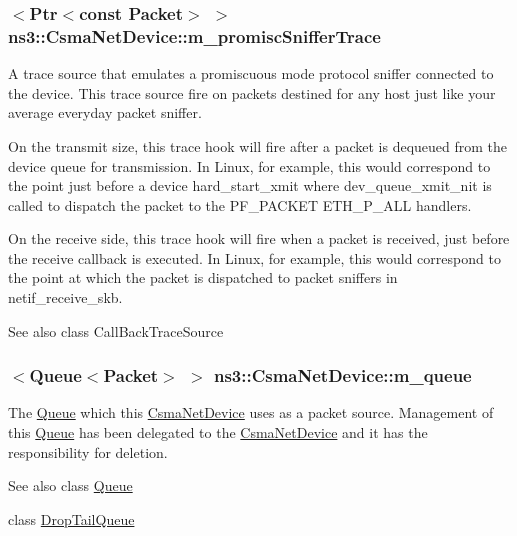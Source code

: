 \subsubsection[{\texorpdfstring{m\+\_\+promisc\+Sniffer\+Trace}{m_promiscSnifferTrace}}]{$<${\bf Ptr}$<$const {\bf Packet}$>$ $>$ ns3\+::\+Csma\+Net\+Device\+::m\+\_\+promisc\+Sniffer\+Trace\hspace{0.3cm}{\ttfamily [private]}}\hypertarget{classns3_1_1CsmaNetDevice_aae7fbd28077e7ac8efee738c4194ed16}{}\label{classns3_1_1CsmaNetDevice_aae7fbd28077e7ac8efee738c4194ed16}
A trace source that emulates a promiscuous mode protocol sniffer connected to the device. This trace source fire on packets destined for any host just like your average everyday packet sniffer.

On the transmit size, this trace hook will fire after a packet is dequeued from the device queue for transmission. In Linux, for example, this would correspond to the point just before a device hard\+\_\+start\+\_\+xmit where dev\+\_\+queue\+\_\+xmit\+\_\+nit is called to dispatch the packet to the P\+F\+\_\+\+P\+A\+C\+K\+ET E\+T\+H\+\_\+\+P\+\_\+\+A\+LL handlers.

On the receive side, this trace hook will fire when a packet is received, just before the receive callback is executed. In Linux, for example, this would correspond to the point at which the packet is dispatched to packet sniffers in netif\+\_\+receive\+\_\+skb.

\begin{DoxySeeAlso}{See also}
class Call\+Back\+Trace\+Source 
\end{DoxySeeAlso}
\subsubsection[{\texorpdfstring{m\+\_\+queue}{m_queue}}]{$<${\bf Queue}$<${\bf Packet}$>$ $>$ ns3\+::\+Csma\+Net\+Device\+::m\+\_\+queue\hspace{0.3cm}{\ttfamily [private]}}\hypertarget{classns3_1_1CsmaNetDevice_a499be4029c01107f7f16f5371843ffde}{}\label{classns3_1_1CsmaNetDevice_a499be4029c01107f7f16f5371843ffde}
The \hyperlink{classns3_1_1Queue}{Queue} which this \hyperlink{classns3_1_1CsmaNetDevice}{Csma\+Net\+Device} uses as a packet source. Management of this \hyperlink{classns3_1_1Queue}{Queue} has been delegated to the \hyperlink{classns3_1_1CsmaNetDevice}{Csma\+Net\+Device} and it has the responsibility for deletion. \begin{DoxySeeAlso}{See also}
class \hyperlink{classns3_1_1Queue}{Queue} 

class \hyperlink{classns3_1_1DropTailQueue}{Drop\+Tail\+Queue} 
\end{DoxySeeAlso}
